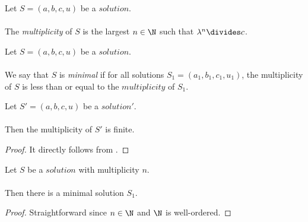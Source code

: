 \begin{definition}
  \label{def:Solution_Multiplicity}
  \leanok
  Let $S=(a, b, c, u)$ be a $solution$. \\\\
  The \textit{multiplicity} of $S$ is the largest $n \in \N$ such that
  $\lambda^n \divides c$.
\end{definition}

\begin{definition}
  \label{def:Solution_Minimal}
  \leanok
  Let $S=(a, b, c, u)$ be a $solution$. \\\\
  We say that $S$ is \textit{minimal} if for all solutions $S_1=(a_1,b_1,c_1,u_1)$,
  the multiplicity of $S$ is less than or equal to the $multiplicity$ of $S_1$.
\end{definition}

\begin{lemma}
  \label{lmm:multiplicity_lambda_c_finite}
  \leanok
  Let $S'=(a, b, c, u)$ be a $solution'$. \\\\
  Then the multiplicity of $S'$ is finite.
\end{lemma}
\begin{proof}
  \leanok
  It directly follows from .
\end{proof}

\begin{lemma}
  \label{lmm:exists_minimal}
  \leanok
  Let $S$ be a $solution$ with multiplicity $n$. \\\\
  Then there is a minimal solution $S_1$.
\end{lemma}
\begin{proof}
  \leanok
  Straightforward since $n \in \N$ and $\N$ is well-ordered.
\end{proof}

